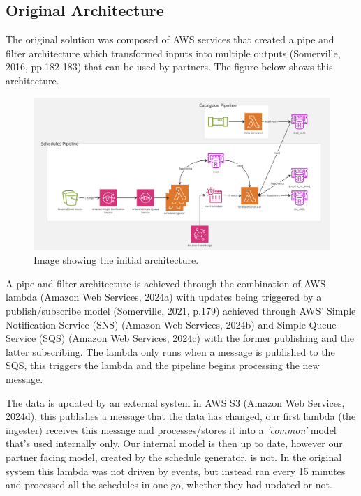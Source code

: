   \subsection{Original Architecture}
  The original solution was composed of AWS services that created a pipe and filter architecture which transformed inputs into multiple outputs 
  (Somerville, 2016, pp.182-183) that can be used by partners. The figure below shows this architecture.
  
  \begin{figure}[H]
    \centering
    \includegraphics[width=12cm]{assets/architectures/starting.png}
    \caption{Image showing the initial architecture.}
    \label{fig:initialArchitecture}
  \end{figure}

  A pipe and filter architecture is achieved through the combination of AWS lambda (Amazon Web Services, 2024a) with updates being triggered by a publish/subscribe 
  model (Somerville, 2021, p.179) achieved through AWS' Simple Notification Service (SNS) (Amazon Web Services, 2024b) and Simple Queue Service (SQS) 
  (Amazon Web Services, 2024c) with the former publishing and the latter subscribing. The lambda only runs when a message is published to the SQS, this triggers 
  the lambda and the pipeline begins processing the new message.

  The data is updated by an external system in AWS S3 (Amazon Web Services, 2024d), this publishes a message that the data has changed, our first lambda 
  (the ingester) receives this message and processes/stores it into a \textit{'common'} model that's used internally only. Our internal model is then up to date,
  however our partner facing model, created by the schedule generator, is not. In the original system this lambda was not driven by events, but instead ran every
  15 minutes and processed all the schedules in one go, whether they had updated or not. 
  

